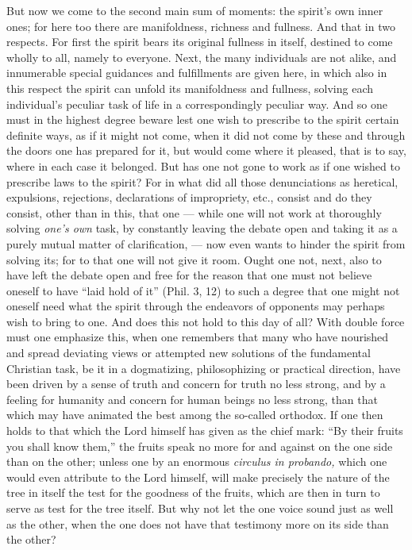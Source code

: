 \documentclass[12pt,a4paper,openany]{book}
\newcommand{\opage}[1]{\marginnote{\footnotesize\textit{[#1]}}}
\begin{document}
But now we come to the second main sum of moments: the spirit's own inner ones; for
here too there are manifoldness, richness and fullness. And that in two respects. For
first the spirit bears its original fullness in itself, destined to come wholly to
all, namely to everyone. Next, the many individuals are not alike, and innumerable
special guidances and fulfillments are given here, in which also in this respect the
spirit can unfold its manifoldness and fullness, solving each individual's peculiar
task of life in a correspondingly peculiar way. And so one must in the highest degree
beware lest one wish to prescribe to the spirit certain definite ways, as if it
\setcounter{footnote}{0}%
\opage{139}might not come, when it did not come by these and through the doors one has
prepared for it, but would come where it pleased, that is to say, where in each case
it belonged. But has one not gone to work as if one wished to prescribe laws to the
spirit? For in what did all those denunciations as heretical, expulsions, rejections,
declarations of impropriety, etc., consist and do they consist, other than in this,
that one --- while one will not work at thoroughly solving \emph{one's own} task, by
constantly leaving the debate open and taking it as a purely mutual matter of
clarification, --- now even wants to hinder the spirit from solving its; for to that
one will not give it room. Ought one not, next, also to have left the debate open and
free for the reason that one must not believe oneself to have ``laid hold of it''
(Phil. 3, 12) to such a degree that one might not oneself need what the spirit
through the endeavors of opponents may perhaps wish to bring to one. And does this
not hold to this day of all? With double force must one emphasize this, when one
remembers that many who have nourished and spread deviating views or attempted new
solutions of the fundamental Christian task, be it in a dogmatizing, philosophizing or
practical direction, have been driven by a sense of truth and concern for truth no
less strong, and by a feeling for humanity and concern for human beings no less
strong, than that which may have animated the best among the so-called orthodox. If
one then holds to that which the Lord himself has given as the chief mark: ``By their
fruits you shall know them,'' the fruits speak no more for and against on the one
side than on the other; unless one by an enormous \textit{circulus in probando,}
which one would even attribute to the Lord himself, will make precisely the nature of
the tree in itself the test for the goodness of the fruits, which are then in turn to
serve as test for the tree itself. But why not let the one voice sound just as well as
the other, when the one does not have that testimony more on its side than the other?
\end{document}

